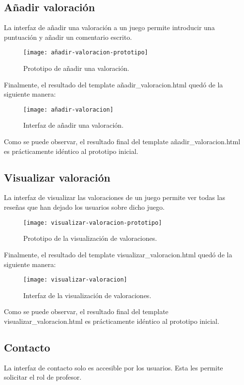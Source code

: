\subsection{Añadir valoración}
La interfaz de añadir una valoración a un juego permite introducir una puntuación y añadir un comentario escrito.

\begin{figure}[htb]
\centering
\texttt{[image: añadir-valoracion-prototipo]}
\caption{Prototipo de añadir una valoración.}
\label{fig:añadir-valoracion-prototipo}
\end{figure}

Finalmente, el resultado del template añadir\_valoracion.html quedó de la siguiente manera:

\begin{figure}[htb]
\centering
\texttt{[image: añadir-valoracion]}
\caption{Interfaz de añadir una valoración.}
\label{fig:añadir-valoracion}
\end{figure}

Como se puede observar, el resultado final del template añadir\_valoracion.html es prácticamente idéntico al prototipo inicial.

\subsection{Visualizar valoración}
La interfaz de visualizar las valoraciones de un juego permite ver todas las reseñas que han dejado los usuarios sobre dicho juego.

\begin{figure}[htb]
\centering
\texttt{[image: visualizar-valoracion-prototipo]}
\caption{Prototipo de la visualización de valoraciones.}
\label{fig:visualizar-valoracion-prototipo}
\end{figure}

Finalmente, el resultado del template visualizar\_valoracion.html quedó de la siguiente manera:

\begin{figure}[htb]
\centering
\texttt{[image: visualizar-valoracion]}
\caption{Interfaz de la visualización de valoraciones.}
\label{fig:visualizar-valoracion}
\end{figure}

Como se puede observar, el resultado final del template visualizar\_valoracion.html es prácticamente idéntico al prototipo inicial.

\subsection{Contacto}
La interfaz de contacto solo es accesible por los usuarios. Esta les permite solicitar el rol de profesor.

